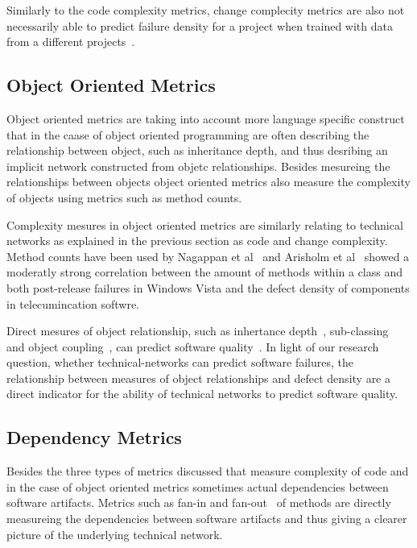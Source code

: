 Similarly to the code complexity metrics, change complecity metrics are also not necessarily able to predict failure density for a project when trained with data from a different projects~\cite{zimmermann:fse:2009}.


\subsection{Object Oriented Metrics}
Object oriented metrics are taking into account more language specific construct that in the caase of object oriented programming are often describing the relationship between object, such as inheritance depth, and thus desribing an implicit network constructed from objetc relationships.
Besides mesureing the relationships between objects object oriented metrics also measure the complexity of objects using metrics such as method counts.

Complexity mesures in object oriented metrics are similarly relating to technical networks as explained in the previous section as code and change complexity.
Method counts have been used by Nagappan et al~\cite{nagappan:icse:2006} and Arisholm et al~\cite{arisholm:isese:2006} showed a moderatly strong correlation between the amount of methods within a class and both post-release failures in Windows Vista and the defect density of components in telecumincation softwre.

Direct mesures of object relationship, such as inhertance depth~\cite{}, sub-classing~\cite{} and object coupling~\cite{}, can predict software quality~\cite{nagappan:icse:2006,arisholm:isese:2006,english:promise:2009}.
In light of our research question, whether technical-networks can predict software failures, the relationship between measures of object relationships and defect density are a direct indicator for the ability of technical networks to predict software quality.


\subsection{Dependency Metrics}
Besides the three types of metrics discussed that measure complexity of code and in the case of object oriented metrics sometimes actual dependencies between software artifacts.
Metrics such as fan-in and fan-out~\cite{} of methods are directly measureing the dependencies between software artifacts and thus giving a clearer picture of the underlying technical network.

